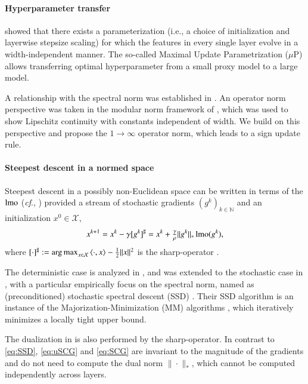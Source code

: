 
\paragraph{Hyperparameter transfer}
 showed that there exists a parameterization (i.e., a choice of initialization and layerwise stepsize scaling) for which the features in every single layer evolve in a width-independent manner.
The so-called Maximal Update Parametrization ($\mu$P) allows transferring optimal hyperparameter from a small proxy model to a large model.

A relationship with the spectral norm was established in \citet{yang2023spectral}.
An operator norm perspective was taken in the modular norm framework of \citet{large2024scalable,bernstein2024modular}, which was used to show Lipschitz continuity with constants independent of width. %
We build on this perspective and propose the $1 \rightarrow \infty$ operator norm, which leads to a sign update rule.

\paragraph{Steepest descent in a normed space}
Steepest descent in a possibly non-Euclidean space can be written in terms of the $\operatorname{lmo}$ (\textit{cf}., )
provided a stream of stochastic gradients $(g^k)_{k\in \mathbb N}$ and an initialization $x^0\in\mathcal X$,
\begin{equation}\label{eq:SSD}
x^{k+1} = x^k - \gamma [g^k]^\sharp = x^k + \tfrac{\gamma}{\rho}\|g^k\|_*\operatorname{lmo}(g^k), 
\end{equation}
where $ [\cdot]^\sharp:=\operatorname*{arg\,max}_{x \in \mathcal X} \braket{\cdot,x} - \tfrac{1}{2}\|x\|^2$ is the sharp-operator \citep{nesterov2012efficiency,kelner2014almost}. 

 The deterministic case is analyzed in \citet{nesterov2012efficiency,kelner2014almost}, and was extended to the stochastic case in \citet{carlson2015stochasticb}, 
with a particular empirically focus on the spectral norm, named as (preconditioned) stochastic spectral descent (SSD) \citep{carlson2015stochastic,carlson2015stochasticb,carlson2015preconditioned}. Their SSD algorithm is an instance of the Majorization-Minimization (MM) algorithms \citep{lange2016mm}, which iteratively minimizes a locally tight upper bound.

The dualization in \citet{bernstein2024modular} is also performed by the sharp-operator.
In contrast to \eqref{eq:SSD}, \ref{eq:uSCG} and \ref{eq:SCG} are invariant to the magnitude of the gradients and do not need to compute the dual norm $\|\cdot\|_*$, which  cannot be computed independently across layers.

